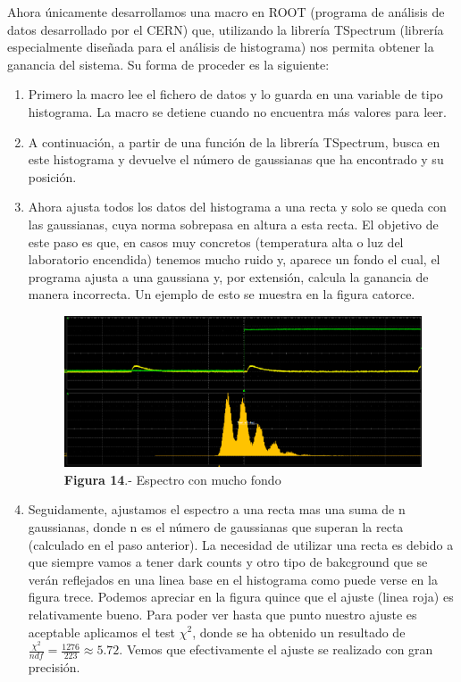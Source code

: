 Ahora únicamente desarrollamos una macro en ROOT (programa de análisis de datos desarrollado por el CERN) que, utilizando la librería TSpectrum (librería especialmente diseñada para el análisis de histograma) nos permita obtener la ganancia del sistema. Su forma de proceder es la siguiente:
\begin{enumerate}
\item {} Primero la macro lee el fichero de datos y lo guarda en una variable de tipo histograma. La macro se detiene cuando no encuentra más valores para leer.

\item {} A continuación, a partir de una función de la librería TSpectrum, busca en este histograma y devuelve el número de gaussianas que ha encontrado y su posición.

\item {} Ahora ajusta todos los datos del histograma a una recta y solo se queda con las gaussianas, cuya norma sobrepasa en altura a esta recta. El objetivo de este paso es que, en casos muy concretos (temperatura alta o luz del laboratorio encendida) tenemos mucho ruido y, aparece un fondo el cual, el programa ajusta a una gaussiana y, por extensión, calcula la ganancia de manera incorrecta. Un ejemplo de esto se muestra en la figura catorce.

\begin{figure}[hbtp]
\centering
\includegraphics[scale=0.4]{fondogaussiano.png}
\caption{\textbf{Figura 14}.- Espectro con mucho fondo}
\end{figure}

\item {} Seguidamente, ajustamos el espectro a una recta mas una suma de n gaussianas, donde n es el número de gaussianas que superan la recta (calculado en el paso anterior). La necesidad de utilizar una recta es debido a que siempre vamos a tener dark counts y otro tipo de bakcground que se verán reflejados en una linea base en el histograma como puede verse en la figura trece. Podemos apreciar en la figura quince que el ajuste (linea roja) es relativamente bueno. Para poder ver hasta que punto nuestro ajuste es aceptable aplicamos el test $\chi^2$, donde se ha obtenido un resultado de $\frac{\chi^2}{ndf}=\frac{1276}{223}\approx 5.72$. Vemos que efectivamente el ajuste se realizado con gran precisión.


\end{enumerate}
